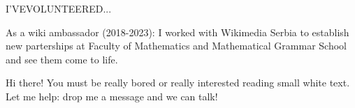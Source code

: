 \begin{minipage}[t]{\linewidth}\vspace{\sectionTopmargin}
{\alignRight\titleFont\light I'VE\linebreak\alignRight VOLUNTEERED...}\linebreak\newline

\vspace{\contentTopMargin}
{\contentFont\bold As a wiki ambassador (2018-2023): \medium I worked with Wikimedia Serbia to establish new parterships at Faculty of Mathematics and Mathematical Grammar School and see them come to life.}

{\parbox{\linewidth}{\color{white}\fontsize{6.5}{8}\selectfont Hi there! You must be really bored or really interested reading small white text. Let me help: drop me a message and we can talk!}}
\end{minipage}